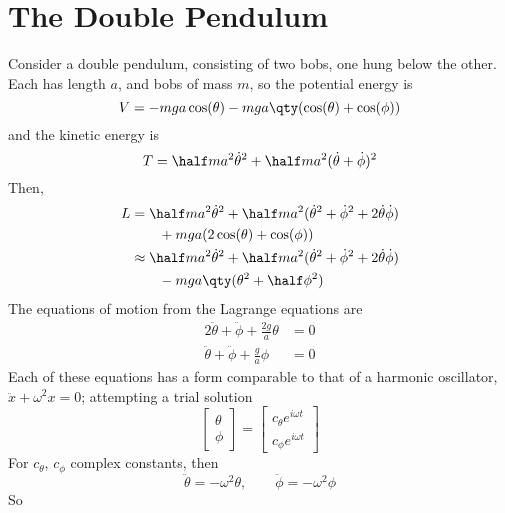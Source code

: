 
\section{The Double Pendulum}
\label{sec:double-pendulum}

Consider a double pendulum, consisting of two bobs, one hung below the
other. Each has length $a$, and bobs of mass $m$, so the potential
energy is
\begin{equation}
  \label{eq:36}
  V = -mga \cos(\theta) - mga \qty( \cos(\theta) + \cos(\phi) )
\end{equation}
and the kinetic energy is
\begin{equation}
  \label{eq:36}
  T = \half m a^2 \dot{\theta}^2 + \half ma^2 (\dot{\theta} + \dot{\phi})^2
\end{equation}
Then,
\begin{align*}
  L & = \half ma^2 \dot{\theta}^2 + \half ma^2 (\dot{\theta}^2 + \dot{\phi}^2 + 2 \dot{\theta} \dot{\phi}) \\
    &                          \qquad  + mga (2 \cos(\theta) + \cos(\phi) ) \\
&\approx \half m a^2 \dot{\theta}^2 + \half m a^2 (\dot{\theta}^2 + \dot{\phi}^2 + 2 \dot{\theta} \dot{\phi}) \\
& \qquad - mga \qty(\theta^2 + \half \phi^2 )
\end{align*}
The equations of motion from the Lagrange equations are
\begin{subequations}
  \begin{align}
    \label{eq:36}
2 \ddot{\theta} + \ddot{\phi} + \frac{2g}{a} \theta & =0 \\
\ddot{\theta} + \ddot{\phi} + \frac{g}{a} \phi &= 0
  \end{align}
\end{subequations}
Each of these equations has a form comparable to that of a harmonic
oscillator, $\ddot{x} + \omega^2 x = 0$; attempting a trial solution
\[
\begin{bmatrix}
  \theta \\ \phi
\end{bmatrix}
=
\begin{bmatrix}
  c_{\theta} e^{i \omega t} \\ c_{\phi} e^{i \omega t}
\end{bmatrix}
\]
For $c_{\theta}$, $c_{\phi}$ complex constants, then
\[ \ddot{\theta} = - \omega^2 \theta, \qquad \ddot{\phi} = - \omega^2 \phi \]
So
